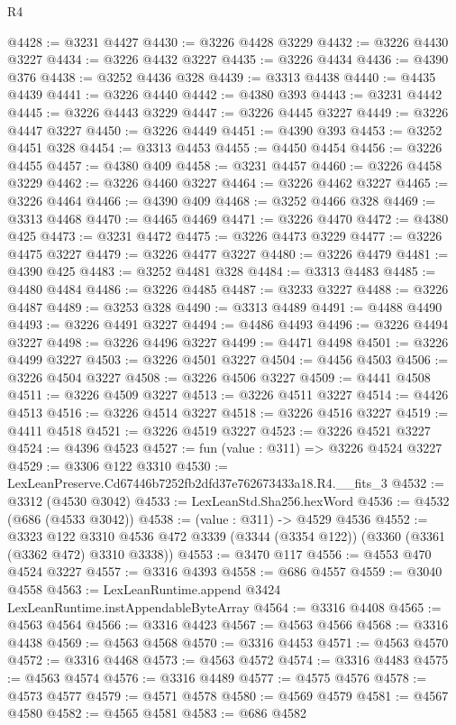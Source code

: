 \begin{lexlean}{R4}
\begin{coremodule}
@4428 := @3231 @4427
@4430 := @3226 @4428 @3229
@4432 := @3226 @4430 @3227
@4434 := @3226 @4432 @3227
@4435 := @3226 @4434
@4436 := @4390 @376
@4438 := @3252 @4436 @328
@4439 := @3313 @4438
@4440 := @4435 @4439
@4441 := @3226 @4440
@4442 := @4380 @393
@4443 := @3231 @4442
@4445 := @3226 @4443 @3229
@4447 := @3226 @4445 @3227
@4449 := @3226 @4447 @3227
@4450 := @3226 @4449
@4451 := @4390 @393
@4453 := @3252 @4451 @328
@4454 := @3313 @4453
@4455 := @4450 @4454
@4456 := @3226 @4455
@4457 := @4380 @409
@4458 := @3231 @4457
@4460 := @3226 @4458 @3229
@4462 := @3226 @4460 @3227
@4464 := @3226 @4462 @3227
@4465 := @3226 @4464
@4466 := @4390 @409
@4468 := @3252 @4466 @328
@4469 := @3313 @4468
@4470 := @4465 @4469
@4471 := @3226 @4470
@4472 := @4380 @425
@4473 := @3231 @4472
@4475 := @3226 @4473 @3229
@4477 := @3226 @4475 @3227
@4479 := @3226 @4477 @3227
@4480 := @3226 @4479
@4481 := @4390 @425
@4483 := @3252 @4481 @328
@4484 := @3313 @4483
@4485 := @4480 @4484
@4486 := @3226 @4485
@4487 := @3233 @3227
@4488 := @3226 @4487
@4489 := @3253 @328
@4490 := @3313 @4489
@4491 := @4488 @4490
@4493 := @3226 @4491 @3227
@4494 := @4486 @4493
@4496 := @3226 @4494 @3227
@4498 := @3226 @4496 @3227
@4499 := @4471 @4498
@4501 := @3226 @4499 @3227
@4503 := @3226 @4501 @3227
@4504 := @4456 @4503
@4506 := @3226 @4504 @3227
@4508 := @3226 @4506 @3227
@4509 := @4441 @4508
@4511 := @3226 @4509 @3227
@4513 := @3226 @4511 @3227
@4514 := @4426 @4513
@4516 := @3226 @4514 @3227
@4518 := @3226 @4516 @3227
@4519 := @4411 @4518
@4521 := @3226 @4519 @3227
@4523 := @3226 @4521 @3227
@4524 := @4396 @4523
@4527 := fun (value : @311) => @3226 @4524 @3227
@4529 := @3306 @122 @3310
@4530 := LexLeanPreserve.Cd67446b7252fb2dfd37e762673433a18.R4.__fits_3
@4532 := @3312 (@4530 @3042)
@4533 := LexLeanStd.Sha256.hexWord
@4536 := @4532 (@686 (@4533 @3042))
@4538 := (value : @311) -> @4529 @4536
@4552 := @3323
    @122
    @3310
    @4536
    @472
    @3339
    (@3344 (@3354 @122))
    (@3360 (@3361 (@3362 @472) @3310 @3338))
@4553 := @3470 @117
@4556 := @4553 @470 @4524 @3227
@4557 := @3316 @4393
@4558 := @686 @4557
@4559 := @3040 @4558
@4563 := LexLeanRuntime.append @3424 LexLeanRuntime.instAppendableByteArray
@4564 := @3316 @4408
@4565 := @4563 @4564
@4566 := @3316 @4423
@4567 := @4563 @4566
@4568 := @3316 @4438
@4569 := @4563 @4568
@4570 := @3316 @4453
@4571 := @4563 @4570
@4572 := @3316 @4468
@4573 := @4563 @4572
@4574 := @3316 @4483
@4575 := @4563 @4574
@4576 := @3316 @4489
@4577 := @4575 @4576
@4578 := @4573 @4577
@4579 := @4571 @4578
@4580 := @4569 @4579
@4581 := @4567 @4580
@4582 := @4565 @4581
@4583 := @686 @4582

\end{coremodule}
\end{lexlean}
